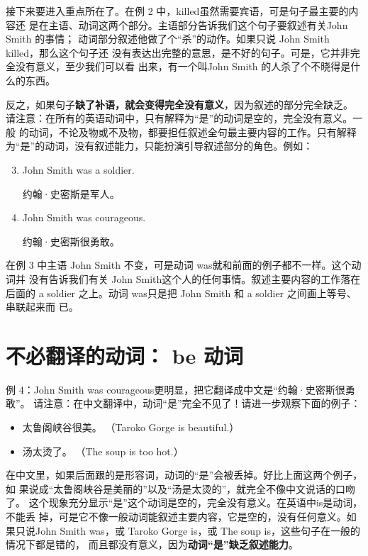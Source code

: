 接下来要进入重点所在了。在例 2 中，killed虽然需要宾语，可是句子最主要的内容还
是在主语、动词这两个部分。主语部分告诉我们这个句子要叙述有关John Smith 的事情；
动词部分叙述他做了个“杀”的动作。如果只说 John Smith killed，那么这个句子还
没有表达出完整的意思，是不好的句子。可是，它并非完全没有意义，至少我们可以看
出来，有一个叫John Smith 的人杀了个不晓得是什么的东西。

反之，如果句子\textbf{缺了补语，就会变得完全没有意义}，因为叙述的部分完全缺乏。
请注意：在所有的英语动词中，只有解释为“是”的动词是空的，完全没有意义。一般
的动词，不论及物或不及物，都要担任叙述全句最主要内容的工作。只有解释
为“是”的动词，没有叙述能力，只能扮演引导叙述部分的角色。例如：

\begin{enumerate}
  \setcounter{enumi}{2}
\item John Smith was a soldier.

  约翰·史密斯是军人。
\item John Smith was courageous.

  约翰·史密斯很勇敢。
\end{enumerate}

在例 3 中主语 John Smith 不变，可是动词 was就和前面的例子都不一样。这个动词并
没有告诉我们有关 John Smith这个人的任何事情。叙述主要内容的工作落在后面的 a
soldier 之上。动词 was只是把 John Smith 和 a soldier 之间画上等号、串联起来而
已。

\section{不必翻译的动词： be 动词}

例 4：John Smith was courageous更明显，把它翻译成中文是“约翰·史密斯很勇敢”。
请注意：在中文翻译中，动词“是”完全不见了！请进一步观察下面的例子：

\begin{itemize}
\item 太鲁阁峡谷很美。 （Taroko Gorge is beautiful.）
\item 汤太烫了。 （The soup is too hot.）
\end{itemize}

在中文里，如果后面跟的是形容词，动词的“是”会被丢掉。好比上面这两个例子，如
果说成“太鲁阁峡谷是美丽的”以及“汤是太烫的”，就完全不像中文说话的口吻了。
这个现象充分显示“是”这个动词是空的，完全没有意义。在英语中is是动词，不能丢
掉，可是它不像一般动词能叙述主要内容，它是空的，没有任何意义。如果只说John
Smith was，或 Taroko Gorge is，或 The soup is，这些句子在一般的情况下都是错的，
而且都没有意义，因为\textbf{动词“是”缺乏叙述能力}。

